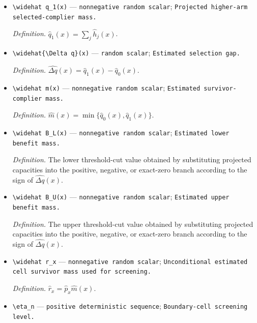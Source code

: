 \documentclass{article}
\begin{document}
\begin{itemize}
  \par\smallskip\noindent\emph{Definition.} \(\widehat q_0(x)=\sum_i\widehat\ell_i(x)\).
  \item \texttt{\textbackslash{}\allowbreak{}widehat q\_\allowbreak{}1(x)} --- \texttt{nonnegative random scalar}; \texttt{Projected higher-\allowbreak{}arm selected-\allowbreak{}complier mass.}
  \par\smallskip\noindent\emph{Definition.} \(\widehat q_1(x)=\sum_j\widehat h_j(x)\).
  \item \texttt{\textbackslash{}\allowbreak{}widehat\{\textbackslash{}\allowbreak{}Delta q\}\allowbreak{}(x)} --- \texttt{random scalar}; \texttt{Estimated selection gap.}
  \par\smallskip\noindent\emph{Definition.} \(\widehat{\Delta q}(x)=\widehat q_1(x)-\widehat q_0(x)\).
  \item \texttt{\textbackslash{}\allowbreak{}widehat m(x)} --- \texttt{nonnegative random scalar}; \texttt{Estimated survivor-\allowbreak{}complier mass.}
  \par\smallskip\noindent\emph{Definition.} \(\widehat m(x)=\min\{\widehat q_0(x),\widehat q_1(x)\}\).
  \item \texttt{\textbackslash{}\allowbreak{}widehat B\_\allowbreak{}L(x)} --- \texttt{nonnegative random scalar}; \texttt{Estimated lower benefit mass.}
  \par\smallskip\noindent\emph{Definition.} The lower threshold-cut value obtained by substituting projected capacities into the positive, negative, or exact-zero branch according to the sign of \(\widehat{\Delta q}(x)\).
  \item \texttt{\textbackslash{}\allowbreak{}widehat B\_\allowbreak{}U(x)} --- \texttt{nonnegative random scalar}; \texttt{Estimated upper benefit mass.}
  \par\smallskip\noindent\emph{Definition.} The upper threshold-cut value obtained by substituting projected capacities into the positive, negative, or exact-zero branch according to the sign of \(\widehat{\Delta q}(x)\).
  \item \texttt{\textbackslash{}\allowbreak{}widehat r\_\allowbreak{}x} --- \texttt{nonnegative random scalar}; \texttt{Unconditional estimated cell survivor mass used for screening.}
  \par\smallskip\noindent\emph{Definition.} \(\widehat r_x=\widehat p_x\widehat m(x)\).
  \item \texttt{\textbackslash{}\allowbreak{}eta\_\allowbreak{}n} --- \texttt{positive deterministic sequence}; \texttt{Boundary-\allowbreak{}cell screening level.}

\end{itemize}
\end{document}
